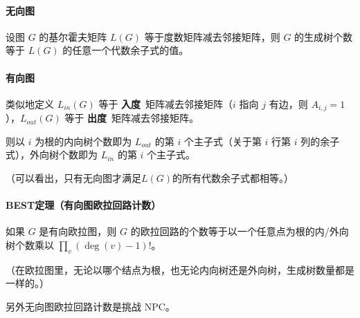 \paragraph{无向图} 设图 $G$ 的基尔霍夫矩阵 $L(G)$ 等于度数矩阵减去邻接矩阵，则 $G$ 的生成树个数等于 $L(G)$ 的任意一个代数余子式的值。

\paragraph{有向图} 类似地定义 $L_{in}(G)$ 等于 \textbf{入度}\ 矩阵减去邻接矩阵（$i$ 指向 $j$ 有边，则 $A_{i, j} = 1$），$L_{out}(G)$ 等于 \textbf{出度}\ 矩阵减去邻接矩阵。

则以 $i$ 为根的内向树个数即为 $L_{out}$ 的第 $i$ 个主子式（关于第 $i$ 行第 $i$ 列的余子式），外向树个数即为 $L_{in}$ 的第 $i$ 个主子式。

（可以看出，只有无向图才满足$L(G)$的所有代数余子式都相等。）

\paragraph{BEST定理（有向图欧拉回路计数）} 如果 $G$ 是有向欧拉图，则 $G$ 的欧拉回路的个数等于以一个任意点为根的内/外向树个数乘以 $\prod_v (\deg(v) - 1) !$。

（在欧拉图里，无论以哪个结点为根，也无论内向树还是外向树，生成树数量都是一样的。）

另外无向图欧拉回路计数是挑战 NPC。

